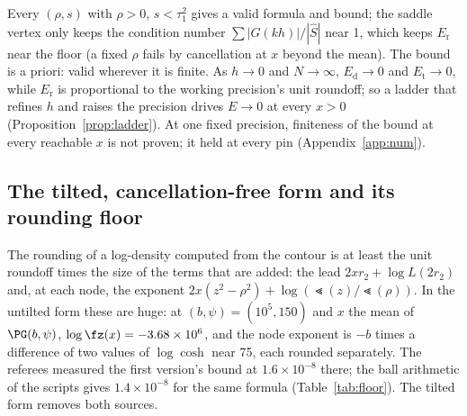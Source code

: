 \begin{remark}\label{rem:coverage}
Every $(\rho,s)$ with $\rho>0$, $s<\tau_1^2$ gives a valid formula and bound; the saddle vertex only keeps the
condition number $\sum|G(kh)|/|\hat S|$ near 1, which keeps $E_{\mathrm r}$ near the floor (a fixed $\rho$ fails
by cancellation at $x$ beyond the mean). The bound is a priori: valid wherever it is finite. As $h\to0$ and
$N\to\infty$, $E_{\mathrm d}\to0$ and $E_{\mathrm t}\to0$, while $E_{\mathrm r}$ is proportional to the working
precision's unit roundoff; so a ladder that refines $h$ and raises the precision drives $E\to0$ at every $x>0$
(Proposition~\ref{prop:ladder}). At one fixed precision, finiteness of the bound at every reachable $x$ is not
proven; it held at every pin (Appendix~\ref{app:num}).
\end{remark}

\subsection{The tilted, cancellation-free form and its rounding floor}\label{sec:floor}

The rounding of a log-density computed from the contour is at least the unit roundoff times the size of the terms
that are added: the lead $2xr_2+\log L(2r_2)$ and, at each node, the exponent $2x(z^2-\rho^2)+\log(\Lt(z)/\Lt(\rho))$.
In the untilted form these are huge: at $(b,\psi)=(10^5,150)$ and $x$ the mean of $\PG(b,\psi)$, $\log\fz(x)=
-3.68\times10^6$, and the node exponent is $-b$ times a difference of two values of $\log\cosh$ near 75, each
rounded separately. The referees measured the first version's bound at $1.6\times10^{-8}$ there; the ball
arithmetic of the scripts gives $1.4\times10^{-8}$ for the same formula (Table~\ref{tab:floor}). The tilted form
removes both sources.

